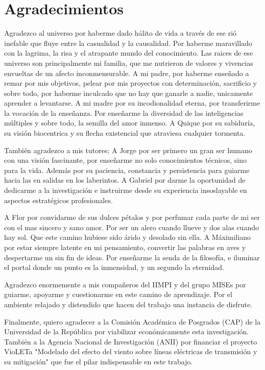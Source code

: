 \chapter*{Agradecimientos}

Agradezco al universo por haberme dado hálito de vida a través de ese rió inefable que fluye entre la casualidad y la causalidad. Por haberme maravillado con la lagrima, la risa y el atrapante mundo del conocimiento. Las raices de ese universo son principalmente mi familia, que me nutrieron de valores y vivencias envueltas de un afecto inconmensurable. A mi padre, por haberme enseñado a remar por mis objetivos, pelear por mis proyectos con determinación, sacrificio y sobre todo, por haberme inculcado que no hay que ganarle a nadie, unicamente aprender a levantarse. A mi madre por su incodionalidad eterna, por transferirme la vocación de la enseñanza. Por enseñarme la diversidad de las inteligencias múltiples y sobre todo, la semilla del amor inmenso. A Quique por su sabiduría, su visión biocentrica y su flecha existencial que atraviesa cualquier tormenta. 

También agradezco a mis tutores; A Jorge por ser primero un gran ser humano con una visión fascinante, por enseñarme no solo conocimientos técnicos, sino para la vida. Además por su paciencia, constancia y persistencia para guiarme hacia las en salidas en los laberintos. A Gabriel por darme la oportunidad de dedicarme a la investigación e instruirme desde su experiencia insoslayable en aspectos estratégicos profesionales.   

A Flor por convidarme de sus dulces pétalos y por perfumar cada parte de mi ser con el mas sincero y sano amor. Por ser un alero cuando llueve y dos alas cuando hay sol. Que este camino hubiese sido árido y desolado sin ella. A Máximiliano por estar siempre latente en mi pensamiento, convertir las palabras en aves y despertarme un sin fin de ideas. Por enseñarme la senda de la filosofía, e iluminar el portal donde un punto es la inmensidad, y un segundo la eternidad.

Agradezco enormemente a mis compañeros del IIMPI y del grupo MISEs por guiarme, apoyarme y cuestionarme en este camino de aprendizaje. Por el ambiente relajado y distendido que hacen del trabajo una instancia de disfrute.

Finalmente, quiero agradecer a la Comisión Académica de Posgrados (CAP) de la Universidad de la República por viabilizar económicamente esta investigación. También a la Agencia Nacional de Investigación (ANII) por financiar el proyecto VioLETa "Modelado del efecto del viento sobre líneas eléctricas de  transmisión y su mitigación" que fue el pilar indispensable en este trabajo.
